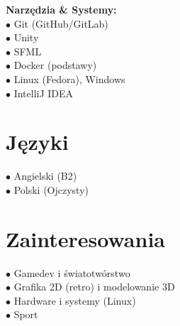 \documentclass[10pt,a4paper,sans]{article}
\begin{document}
\begin{minipage}[t]{6cm}
\begin{minipage}{5cm}
        \vspace{2pt}
        \textbf{Narzędzia \& Systemy:} \\
        $\bullet$ Git (GitHub/GitLab) \\
        $\bullet$ Unity \\
        $\bullet$ SFML \\
        $\bullet$ Docker (podstawy) \\
        $\bullet$ Linux (Fedora), Windows \\
        $\bullet$ IntelliJ IDEA

        \section*{Języki}
        $\bullet$ Angielski (B2) \\
        $\bullet$ Polski (Ojczysty)

        \section*{Zainteresowania}
        $\bullet$ Gamedev i światotwórstwo \\
        $\bullet$ Grafika 2D (retro) i modelowanie 3D \\
        $\bullet$ Hardware i systemy (Linux) \\
        $\bullet$ Sport
    \end{minipage}
\end{minipage}%
\hspace{0.5cm}%
\end{document}
